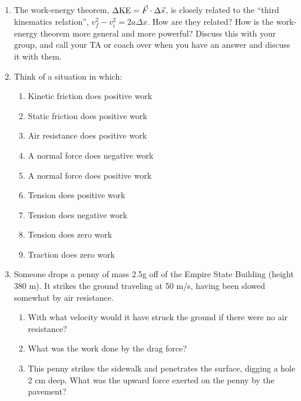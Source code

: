 \documentclass[12pt]{article}
\begin{document}
\Large
\centerline{}
\normalsize
\centerline{}

\begin{enumerate}

\item The work-energy theorem, $\Delta {\rm KE} = \vec F \cdot \Delta \vec s$, is closely related to the ``third kinematics relation'', $v_f^2 - v_i^2 = 2a\Delta x$.
How are they related? How is the work-energy theorem more general and more powerful? Discuss this with your group, and call your TA or coach over when you have
an answer and discuss it with them.

\vspace{2in}


\item Think of a situation in which:
\begin{enumerate}
\item Kinetic friction does positive work 
\item Static friction does positive work
\item Air resistance does positive work
\item A normal force does negative work
\item A normal force does positive work
\item Tension does positive work
\item Tension does negative work
\item Tension does zero work
\item Traction does zero work
\end{enumerate}

\newpage
\item{Someone drops a penny of mass 2.5g off of the Empire State Building (height 380 m). It strikes the ground traveling at 50 m/s, having been slowed somewhat by air resistance.}
\begin{enumerate}
\item{With what velocity would it have struck the ground if there were no air resistance?}
\vspace{2in}
\item{What was the work done by the drag force?}
\vspace{2in}
\item{This penny strikes the sidewalk and penetrates the surface, digging a hole 2 cm deep. What was the upward force exerted on the penny by the pavement?}
\vspace{2in}
\end{enumerate}


\end{enumerate}
\end{document}

